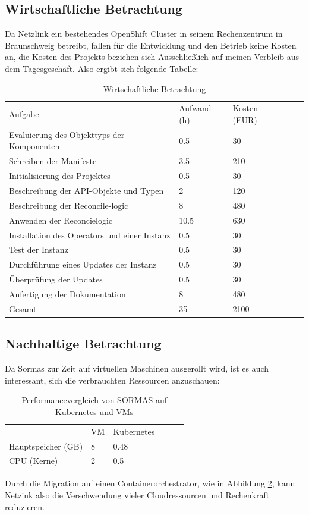 \documentclass[a4paper,11pt]{article}
\begin{document}
    \subsection{Wirtschaftliche Betrachtung}
    Da Netzlink ein bestehendes OpenShift Cluster in seinem Rechenzentrum in Braunschweig betreibt, fallen für die Entwicklung und den Betrieb keine Kosten an,
    die Kosten des Projekts beziehen sich Ausschließlich auf meinen Verbleib aus dem Tagesgeschäft. Also ergibt sich folgende Tabelle:
    \begin{table}[!ht]
        \centering
        \caption{Wirtschaftliche Betrachtung}
        \label{tab:wirt-betr}
        \begin{tabular}{lllll}
         Aufgabe &  Aufwand (h) & Kosten (EUR)  \\
         Evaluierung des Objekttyps der Komponenten & 0.5 & 30  \\
         Schreiben der Manifeste & 3.5 & 210 \\
         Initialisierung des Projektes & 0.5 & 30 \\
         Beschreibung der API-Objekte und Typen & 2 & 120 \\
         Beschreibung der Reconcile-logic & 8 &  480 \\
         Anwenden der Reconcielogic & 10.5 & 630 \\
         Installation des Operators und einer Instanz & 0.5 & 30 \\
         Test der Instanz & 0.5 & 30 \\
         Durchführung eines Updates der Instanz & 0.5 & 30 \\
         Überprüfung der Updates & 0.5 & 30 \\
         Anfertigung der Dokumentation & 8 & 480 \\
         Gesamt & 35  & 2100 \\
        \end{tabular}
    \end{table}
    \subsection{Nachhaltige Betrachtung} 
    Da Sormas zur Zeit auf virtuellen Maschinen ausgerollt wird, ist es auch interessant,
    sich die verbrauchten Ressourcen anzuschauen:
    \begin{table}
        \caption{Performancevergleich von SORMAS auf Kubernetes und VMs}
        \label{tab:perf_k8s_vm}
        \begin{tabular}{llllll}
           & VM & Kubernetes \\
           Hauptspeicher (GB) & 8 & 0.48 \\
           CPU (Kerne) & 2 & 0.5 \\
        \end{tabular}
    \end{table}
    Durch die Migration auf einen Containerorchestrator, wie in Abbildung \ref{tab:perf_k8s_vm}, kann Netzink also 
    die Verschwendung vieler Cloudressourcen und Rechenkraft reduzieren.
\end{document}
